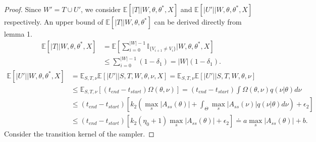 \begin{proof}
Since $W' = T \cup U'$, we consider $\mathbb{E}[|T| | W, \theta, \theta^*, X]$ and $\mathbb{E}[|U'| | W, \theta, \theta^*, X]$ respectively.
An upper bound of $\mathbb{E}[|T| | W, \theta, \theta^*]$ can be derived directly from lemma 1.
\begin{align*}
\mathbb{E}[|T| | W, \theta, \theta^*, X] &= \mathbb{E}[\sum_{i = 0}^{|W| - 1} \mathbb{I}_{\{ V_{i + 1} \neq V_i \}}| W, \theta, \theta^*, X]\\
&\leq \sum_{i = 0}^{|W| - 1} (1 - \delta_1) = |W|(1 - \delta_1).
\end{align*}
\begin{align*}
\mathbb{E}[|U'| |W, \theta, \theta^*, X] &= \mathbb{E}_{S,T, \nu}\mathbb{E}[|U'| | S, T, W, \theta, \nu, X] = \mathbb{E}_{S,T, \nu}\mathbb{E}[|U'| | S, T, W, \theta, \nu] \\
& \leq \mathbb{E}_{S,T, \nu} \left[(t_{end} - t_{start})\Omega(\theta, \nu)\right] = (t_{end} - t_{start})\int \Omega(\theta, \nu) q(\nu | \theta) d\nu\\
& \leq (t_{end} - t_{start})\left[ k_2 \left(  \max_s|A_{ss}(\theta)| +  \int_\Theta \max_s|A_{ss}(\nu)|q(\nu | \theta)d\nu \right) + \epsilon_2 \right] \\
& \leq (t_{end} - t_{start}) \left[ k_2 (\eta_0 + 1) \max_s|A_{ss}(\theta)| + \epsilon_2 \right] \doteq a \max_s|A_{ss}(\theta)| + b.
\end{align*}
Consider the transition kernel of the sampler.


\end{proof}
